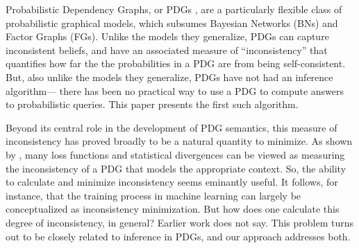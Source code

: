 \documentclass[twoside]{article}
\begin{document}
Probabilistic Dependency Graphs, or PDGs \parencite{pdg-aaai},
are a particularly flexible class of probabilistic graphical models, which subsumes Bayesian Networks (BNs) 
and Factor Graphs (FGs). 
Unlike the models they generalize,
PDGs can capture inconsistent beliefs, and have an associated measure
of ``inconsistency'' that quantifies how far the the probabilities in a PDG are from being self-consistent.
But, also unlike the models they generalize, 
PDGs have not had an inference algorithm---%
there has been no practical way to use a PDG to compute answers to
probabilistic queries.
This paper presents the first such algorithm.

Beyond its central role in the development of PDG semantics, this measure of inconsistency has proved broadly to be a natural quantity to minimize.
As shown by \textcite{one-true-loss},
many
    loss functions and statistical divergences 
    can be viewed as measuring the inconsistency
    of a PDG that models the appropriate context.  
So, the ability to calculate and minimize inconsistency seems eminantly useful.
It follows, for instance, that the training process in machine learning can largely be conceptualized as inconsistency minimization. 
But how {does} one calculate this degree of inconsistency, in general?
Earlier work does not say. 
%
This problem turns out to be closely related to inference in PDGs,
and our approach addresses both. 
\end{document}
